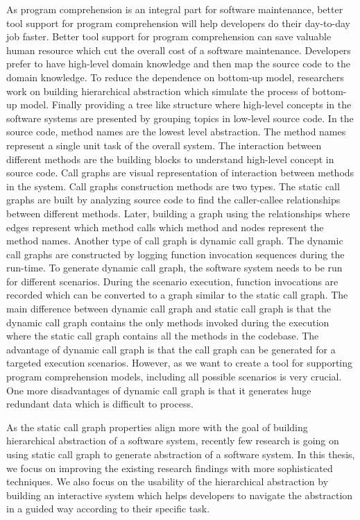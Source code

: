  As program comprehension is an integral part for software maintenance, better tool support for program comprehension will help developers do their day-to-day job faster. Better tool support for program comprehension can save valuable human resource which cut the overall cost of a software maintenance. Developers prefer to have high-level domain knowledge and then map the source code to the domain knowledge. To reduce the dependence on bottom-up model, researchers work on building hierarchical abstraction which simulate the process of bottom-up model. Finally providing a tree like structure where high-level concepts in the software systems are presented by grouping topics in low-level source code. 
\newpage
In the source code, method names are the lowest level abstraction. The method names represent a single unit task of the overall system. The interaction between different methods are the building blocks to understand high-level concept in source code. Call graphs are visual representation of interaction between methods in the system. Call graphs construction methods are two types. The static call graphs are built by analyzing source code to find the caller-callee relationships between different methods. Later, building a graph using the relationships where edges represent which method calls which method and nodes represent the method names. Another type of call graph is dynamic call graph. The dynamic call graphs are constructed by logging function invocation sequences during the run-time. To generate dynamic call graph, the software system needs to be run for different scenarios. During the scenario execution, function invocations are recorded which can be converted to a graph similar to the static call graph. The main difference between dynamic call graph and static call graph is that the dynamic call graph contains the only methods invoked during the execution where the static call graph contains all the methods in the codebase. The advantage of dynamic call graph is that the call graph can be generated for a targeted execution scenarios. However, as we want to create a tool for supporting program comprehension models, including all possible scenarios is very crucial. One more disadvantages of dynamic call graph is that it generates huge redundant data which is difficult to process. 

As the static call graph properties align more with the goal of building hierarchical abstraction of a software system, recently few research is going on using static call graph to generate abstraction of a software system. In this thesis, we focus on improving the existing research findings with more sophisticated techniques. We also focus on the usability of the hierarchical abstraction by building an interactive system which helps developers to navigate the abstraction in a guided way according to their specific task. 

